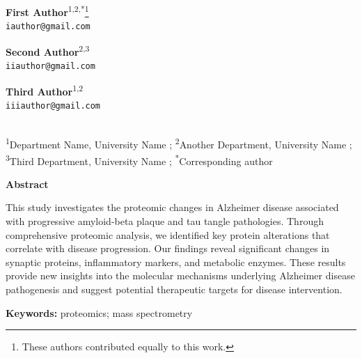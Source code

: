 \documentclass[11pt,a4paper]{article}
\begin{document}
\begin{titlepage}
    \begin{center}
    \large
    \begin{minipage}[t]{0.3\textwidth}
    \centering
    \textbf{First Author}\textsuperscript{1,2,*}\thanks{These authors contributed equally to this work.} \\
    \texttt{iauthor@gmail.com}
    \end{minipage}
    \begin{minipage}[t]{0.3\textwidth}
    \centering
    \textbf{Second Author}\textsuperscript{2,3} \\
    \texttt{iiauthor@gmail.com}
    \end{minipage}
    \begin{minipage}[t]{0.3\textwidth}
    \centering
    \textbf{Third Author}\textsuperscript{1,2} \\
    \texttt{iiiauthor@gmail.com}
    \end{minipage} \\[1cm]
    \footnotesize
    \textsuperscript{1}Department Name, University Name ;
    \textsuperscript{2}Another Department, University Name ;
    \textsuperscript{3}Third Department, University Name ;
    \textsuperscript{*}Corresponding author
    \end{center}
    \vspace{1cm}


    
    \begin{minipage}{0.9\textwidth}
    \begin{center}
    \textbf{\large Abstract}
    \end{center}
    \large
    This study investigates the proteomic changes in Alzheimer disease associated with progressive amyloid-beta plaque and tau tangle pathologies. Through comprehensive proteomic analysis, we identified key protein alterations that correlate with disease progression. Our findings reveal significant changes in synaptic proteins, inflammatory markers, and metabolic enzymes. These results provide new insights into the molecular mechanisms underlying Alzheimer disease pathogenesis and suggest potential therapeutic targets for disease intervention.
    \end{minipage}


    \vspace{11cm}
    \begin{minipage}{0.9\textwidth}
    \begin{center}
    \end{center}
    \large
    \textbf{Keywords:} proteomics; mass spectrometry
    \end{minipage}
    

\end{titlepage}


\newpage

\end{document}
